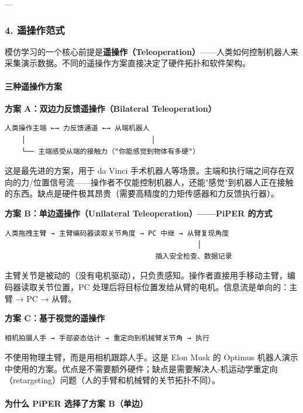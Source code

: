 \documentclass[UTF8,a4paper,11pt]{ctexart}
\begin{document}
---

\subsubsection{4. 遥操作范式}

模仿学习的一个核心前提是\textbf{遥操作（Teleoperation）}——人类如何控制机器人来采集演示数据。不同的遥操作方案直接决定了硬件拓扑和软件架构。

\paragraph{三种遥操作方案}


\textbf{方案 A：双边力反馈遥操作（Bilateral Teleoperation）}

\begin{lstlisting}[language=text]
人类操作主端 ←→ 力反馈通道 ←→ 从端机器人
    │                              │
    └── 主端感受从端的接触力（"你能感觉到物体有多硬"）
\end{lstlisting}

这是最先进的方案，用于 da Vinci 手术机器人等场景。主端和执行端之间存在双向的力/位置信号流——操作者不仅能控制机器人，还能"感觉"到机器人正在接触的东西。缺点是硬件极其昂贵（需要高精度的力矩传感器和力反馈执行器）。

\textbf{方案 B：单边遥操作（Unilateral Teleoperation）——PiPER 的方式}

\begin{lstlisting}[language=text]
人类拖拽主臂 → 主臂编码器读取关节角度 → PC 中继 → 从臂复现角度
                                              │
                                    插入安全检查、数据记录
\end{lstlisting}

主臂关节是被动的（没有电机驱动），只负责感知。操作者直接用手移动主臂，编码器读取关节位置，PC 处理后将目标位置发给从臂的电机。信息流是单向的：主臂 → PC → 从臂。

\textbf{方案 C：基于视觉的遥操作}

\begin{lstlisting}[language=text]
相机拍摄人手 → 手部姿态估计 → 重定向到机械臂关节角 → 执行
\end{lstlisting}

不使用物理主臂，而是用相机跟踪人手。这是 Elon Musk 的 Optimus 机器人演示中使用的方案。优点是不需要额外硬件；缺点是需要解决人-机运动学重定向（retargeting）问题（人的手臂和机械臂的关节拓扑不同）。

\paragraph{为什么 PiPER 选择了方案 B（单边）}
\end{document}
